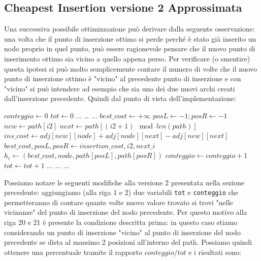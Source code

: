 \documentclass[a4paper,12pt]{report}
\begin{document}
\subsection{Cheapest Insertion versione 2 Approssimata}
Una successiva possibile ottimizzazione può derivare dalla seguente osservazione: una volta che il punto di inserzione ottimo si perde perché è stato già inserito un nodo proprio in quel punto, può essere ragionevole pensare che il nuovo punto di inserimento ottimo sia vicino a quello appena perso. Per verificare (o smentire) questa ipotesi si può molto semplicemente contare il numero di volte che il nuovo punto di inserzione ottimo è "vicino" al precedente punto di inserzione e con "vicino" si può intendere ad esempio che sia uno dei due nuovi archi creati dall'inserzione precedente. Quindi dal punto di vista dell'implementazione:
\begin{tcolorbox}[colframe=black, colback=white, boxrule=0.5pt, title=Cheapest Insertion Versione 2, coltitle=black, fonttitle=\bfseries, colbacktitle=white, breakable]
  \begin{algorithmic}[1]
    \State $conteggio \gets 0$
    \State $tot \gets 0$
    \State ...
      \State \dots
        \State ...
          \State $best\_cost \gets +\infty$
          \State $posL \gets -1; posR \gets -1$
            \State $new \gets path[i2]$
            \State $next \gets path[(i2 + 1) \mod len(path)]$
            \State $ins\_cost \gets adj[new][node] + adj[node][next] - adj[new][next]$
              \State $best\_cost, posL, posR \gets insertion\_cost, i2, next\_i$
            \EndIf
          \EndFor
          \State $h_i \gets (best\_cost, node, path[posL], path[posR])$
            \State $conteggio \gets conteggio + 1$
          \EndIf
            \State $tot \gets tot + 1$
          \EndIf
          \State ...
        \EndFor
        \State ...
      \EndWhile
      \State ...
  \end{algorithmic}
\end{tcolorbox}
Possiamo notare le seguenti modifiche alla versione 2 presentata nella sezione precedente: aggiungiamo (alla riga 1 e 2) due variabili \lstinline!tot! e \lstinline!conteggio! che permetteranno di contare quante volte nuovo valore trovato si trovi "nelle vicinanze" del punto di inserzione del nodo precedente. Per questo motivo alla riga 20 e 21 è presente la condizione descritta prima: in questo caso stiamo considerando un punto di inserzione "vicino" al punto di inserzione del nodo precedente se dista al massimo 2 posizioni all'interno del path. Possiamo quindi ottenere una percentuale tramite il rapporto $conteggio/tot$ e i risultati sono:
\end{document}

